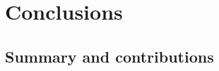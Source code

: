 \chapter{Conclusions} %
\label{chap:conclusions}
\section{Summary and contributions}
\label{conclusions:summary}








